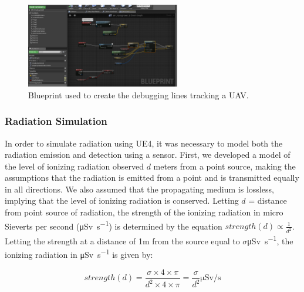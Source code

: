 \begin{figure}
    \centering
    \includegraphics[width=0.6\textwidth]{Chapters/SimulationEnv/Figs/DebuggingLines/PathTracingDebugLines.png}
    \caption{Blueprint used to create the debugging lines tracking a UAV.}
    \label{fig:DebuggingLines}
\end{figure}

\subsubsection{Radiation Simulation}
In order to simulate radiation using UE4, it was necessary to model both the radiation emission and detection using a sensor. First, we developed a model of the level of ionizing radiation observed $d$ meters from a point source, making the assumptions that the radiation is emitted from a point and is transmitted equally in all directions. We also assumed that the propagating medium is lossless, implying that the level of ionizing radiation is conserved. Letting $d$ = distance from point source of radiation, the strength of the ionizing radiation in micro Sieverts per second (\si{\micro\sievert\per\second}) is determined by the equation  $strength(d) \propto \frac{1}{d^2}$. Letting the strength at a distance of 1m from the source equal to
$\sigma$\si{\micro\sievert\per\second}, the ionizing radiation in \si{\micro\sievert\per\second} is given by:

\[strength(d) = \frac{\sigma \times 4 \times \pi}{d^2 \times 4 \times \pi} = \frac{\sigma}{d^2} \si{\micro\sievert\per\second}\]

